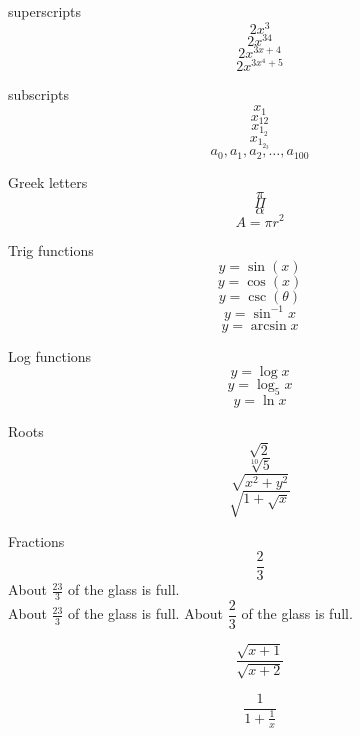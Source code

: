 \documentclass{article}
\begin{document}
superscripts $$2x^3$$
$$2x^{34}$$ 
$$2x^{3x + 4}$$
$$2x^{3x^4 + 5}$$

subscripts
$$x_1$$
$$x_{12}$$
$$x_{1_2}$$
$$x_{1_{2_{3}}}$$
$$a_0,a_1,a_2,\ldots, a_{100}$$

Greek letters
$$\pi$$
$$\Pi$$
$$\alpha$$
$$A = \pi r^2$$

Trig functions
$$y = \sin (x)$$
$$y=\cos (x)$$
$$y=\csc (\theta)$$
$$y=\sin^{-1} x$$
$$y=\arcsin x$$

Log functions
$$y=\log x$$
$$y=\log_5 x$$
$$y=\ln x$$

Roots
$$\sqrt{2}$$
$$\sqrt[10]{5}$$
$$\sqrt{x^2 + y^2}$$
$$\sqrt{1 + \sqrt{x}}$$


Fractions
$$\frac{2}{3}$$
About $\displaystyle \frac{23}{3}$ of the glass is full.\\[6pt]
About $\frac{23}{3}$ of the glass is full.
About $\dfrac{2}{3}$ of the glass is full.

$$\frac{\sqrt{x + 1}}{\sqrt{x + 2}}$$

$$\frac{1}{        1 + \frac{1}{x}        }$$
\end{document}
